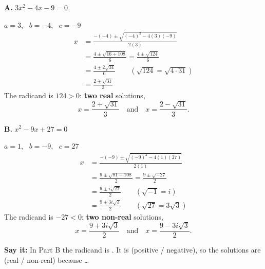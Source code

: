 \begin{minipage}[t]{0.48\textwidth}
\textbf{A.} $3x^2-4x-9=0$

$a=3$, \ $b=-4$, \ $c=-9$
\begin{align*}
x&=\frac{-(-4)\pm\sqrt{(-4)^2-4(3)(-9)}}{2(3)}\\
&=\frac{4\pm\sqrt{16+108}}{6}=\frac{4\pm\sqrt{124}}{6}\\
&=\frac{4\pm2\sqrt{31}}{6} \qquad (\sqrt{124}=\sqrt{4\cdot31})\\
&=\frac{2\pm\sqrt{31}}{3}
\end{align*}
The radicand is $124>0$: \textbf{two real} solutions,
\[x=\frac{2+\sqrt{31}}{3}\quad\text{and}\quad x=\frac{2-\sqrt{31}}{3}.\]
\end{minipage}\hfill
\begin{minipage}[t]{0.48\textwidth}
\textbf{B.} $x^2-9x+27=0$

$a=1$, \ $b=-9$, \ $c=27$
\begin{align*}
x&=\frac{-(-9)\pm\sqrt{(-9)^2-4(1)(27)}}{2(1)}\\
&=\frac{9\pm\sqrt{81-108}}{2}=\frac{9\pm\sqrt{-27}}{2}\\
&=\frac{9\pm i\sqrt{27}}{2} \qquad (\sqrt{-1}=i)\\
&=\frac{9\pm3i\sqrt{3}}{2} \qquad (\sqrt{27}=3\sqrt3)
\end{align*}
The radicand is $-27<0$: \textbf{two non-real} solutions,
\[x=\frac{9+3i\sqrt{3}}{2}\quad\text{and}\quad x=\frac{9-3i\sqrt{3}}{2}.\]
\end{minipage}

\textbf{Say it:} In Part B the radicand is \blank[1.6cm]. It is \blank[2.2cm] (positive / negative), so the solutions are \blank[2.2cm] (real / non-real) because \dots\lines[1]

\newpage

